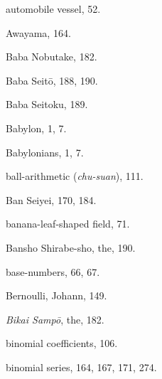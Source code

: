 \documentclass[11pt]{article}
\begin{document}
automobile vessel, 52.\par
Awayama, 164.\par
\medskip
Baba Nobutake, 182.\par
Baba Seitō, 188, 190.\par
Baba Seitoku, 189.\par
Babylon, 1, 7.\par
Babylonians, 1, 7.\par
ball-arithmetic (\emph{chu-suan}), 111.\par
Ban Seiyei, 170, 184.\par
banana-leaf-shaped field, 71.\par
Bansho Shirabe-sho, the, 190.\par
base-numbers, 66, 67.\par
Bernoulli, Johann, 149.\par
\emph{Bikai Sampō}, the, 182.\par
binomial coefficients, 106.\par
binomial series, 164, 167, 171, 274.\par
\end{document}
